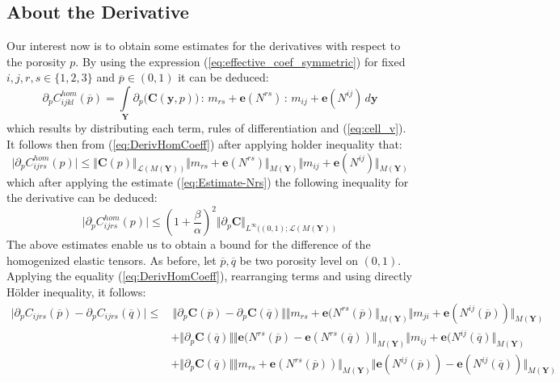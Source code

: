 \subsection{About the Derivative}
Our interest now is to obtain some estimates for the derivatives with respect to the porosity $p$. By using the expression (\ref{eq:effective_coef_symmetric}) for fixed $i,j,r,s \in \{1,2,3\}$ and $\overline{p} \in (0,1)$ it can be deduced:
\begin{equation}
    \label{eq:DerivHomCoeff}
    \partial_{p}  C_{ijkl}^{hom} (\overline{p}) = \int\limits_{\mathbf{Y}} \partial_{p}\big( \mathbf{C}(\mathbf{y},p) \big)\, : \,m_{rs}+\mathbf{e}(N^{rs})\, :\,m_{ij}+\mathbf{e}(N^{ij}) \, d\mathbf{y} 
\end{equation}
which results by distributing each term, rules of differentiation and (\ref{eq:cell_v}).
It follows then from (\ref{eq:DerivHomCoeff}) after applying holder inequality that:
\begin{equation*}
    \vert \partial_p C^{hom}_{ijrs}(p) \vert \leq \Vert \mathbf{C}(p) \Vert_{\mathcal{L}(M(\mathbf{Y}))} \Vert m_{rs} + \mathbf{e}(N^{rs}) \Vert_{M(\mathbf{Y})} \Vert m_{ij} + \mathbf{e}(N^{ij}) \Vert_{M(\mathbf{Y})}
\end{equation*}
which after applying the estimate (\ref{eq:Estimate-Nrs}) the following inequality for the derivative can be deduced:
\begin{equation}
    \label{EstimateDerivHomCoeff}
    \vert \partial_p C^{hom}_{ijrs}(p) \vert \leq (1+\frac{\beta}{\alpha})^2 \Vert \partial_p \mathbf{C}\Vert_{L^{\infty}((0,1); \mathcal{L}(M(\mathbf{Y}))}
\end{equation}
The above estimates enable us to obtain a bound for the difference of the homogenized elastic tensors. As before, let $\overline{p}, \overline{q}$ be two porosity level on $(0,1)$.
Applying the equality (\ref{eq:DerivHomCoeff}), rearranging terms and using directly H\"{o}lder inequality, it follows:
\begin{align*}
    \vert \partial_p C_{ijrs}(\overline{p}) - \partial_p C_{ijrs}(\overline{q}) \vert \leq & \,\Vert \partial_p \mathbf{C}(\overline{p}) - \partial_p \mathbf{C}(\overline{q}) \Vert \Vert m_{rs} + \mathbf{e}(N^{rs}(\overline{p}) \Vert_{M(\mathbf{Y})} \Vert m_{ji} + \mathbf{e}(N^{ij}(\overline{p}))\Vert_{M(\mathbf{Y})} \\
    & + \Vert \partial_p \mathbf{C}(\overline{q}) \Vert \Vert \mathbf{e}(N^{rs}(\overline{p}) -\mathbf{e}(N^{rs}(\overline{q})) \Vert_{M(\mathbf{Y})} \Vert m_{ij} + \mathbf{e}(N^{ij}(\overline{q}) \Vert_{M(\mathbf{Y})}  \\
    & + \Vert \partial_p \mathbf{C}(\overline{q}) \Vert \Vert m_{rs} + \mathbf{e}(N^{rs}(\overline{p})) \Vert_{M(\mathbf{Y})} \Vert \mathbf{e}(N^{ij}(\overline{p})) - \mathbf{e}(N^{ij}(\overline{q})) \Vert_{M(\mathbf{Y})}
\end{align*}
